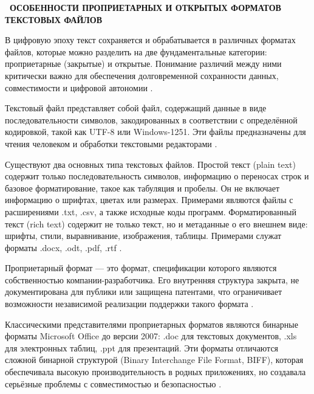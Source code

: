 \documentclass{SibFU-docs}
\begin{document}
\newpage
{}
\begin{center}\textbf{\thesection\ ОСОБЕННОСТИ ПРОПРИЕТАРНЫХ И ОТКРЫТЫХ ФОРМАТОВ ТЕКСТОВЫХ ФАЙЛОВ}\end{center}
\vspace*{-1.5em}


В цифровую эпоху текст сохраняется и обрабатывается в различных форматах файлов, которые можно разделить на две фундаментальные категории: проприетарные (закрытые) и открытые. Понимание различий между ними критически важно для обеспечения долговременной сохранности данных, совместимости и цифровой автономии \cite{kyrjakov2018, semenov2019}.

Текстовый файл представляет собой файл, содержащий данные в виде последовательности символов, закодированных в соответствии с определённой кодировкой, такой как UTF-8 или Windows-1251. Эти файлы предназначены для чтения человеком и обработки текстовыми редакторами \cite{odf2024}.

Существуют два основных типа текстовых файлов. Простой текст (plain text) содержит только последовательность символов, информацию о переносах строк и базовое форматирование, такое как табуляция и пробелы. Он не включает информацию о шрифтах, цветах или размерах. Примерами являются файлы с расширениями .txt, .csv, а также исходные коды программ. Форматированный текст (rich text) содержит не только текст, но и метаданные о его внешнем виде: шрифты, стили, выравнивание, изображения, таблицы. Примерами служат форматы .docx, .odt, .pdf, .rtf \cite{iso26300, ecma376}.


Проприетарный формат — это формат, спецификации которого являются собственностью компании-разработчика. Его внутренняя структура закрыта, не документирована для публики или защищена патентами, что ограничивает возможности независимой реализации поддержки такого формата \cite{msft2024}.

Классическими представителями проприетарных форматов являются бинарные форматы Microsoft Office до версии 2007: .doc для текстовых документов, .xls для электронных таблиц, .ppt для презентаций. Эти форматы отличаются сложной бинарной структурой (Binary Interchange File Format, BIFF), которая обеспечивала высокую производительность в родных приложениях, но создавала серьёзные проблемы с совместимостью и безопасностью \cite{petrov2022}.
\end{document}
